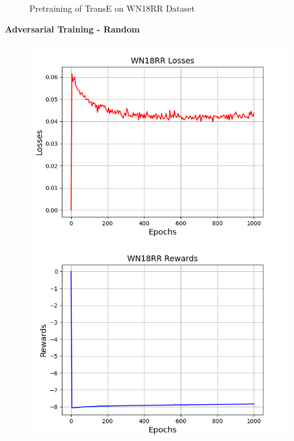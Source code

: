 \begin{figure}
\begin{minipage}{.3\textwidth}
    \end{minipage}%
    \caption{Pretraining of TransE on WN18RR Dataset}
    \label{fig:test}
\end{figure}

\pagebreak


\textbf{Adversarial Training - Random}\\
\begin{figure}
    \centering
    \begin{minipage}{.5\textwidth}
      \centering
      \includegraphics[width=0.9\linewidth]{figures/results/WN18RR/AdversarialTraining/Random/gan_train_wn18rr_losses.png}
    \end{minipage}%
    \begin{minipage}{.5\textwidth}
      \centering
      \includegraphics[width=0.9\linewidth]{figures/results/WN18RR/AdversarialTraining/Random/gan_train_wn18rr_rewards.png}

\end{minipage}
\end{figure}
